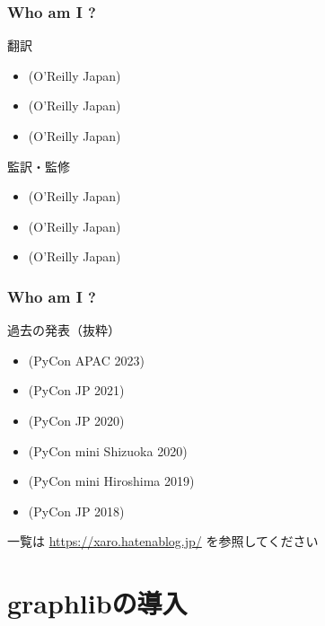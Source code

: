 \documentclass[aspectratio=169,dvipdfmx,12pt,notheorems]{beamer}
\theoremstyle{definition}
\begin{document}
\begin{frame}\frametitle{Who am I ?}

\begin{block}{翻訳}
\begin{itemize}
\item {}(O'Reilly Japan) 
\item {}(O'Reilly Japan)
\item {}(O'Reilly Japan)
\end{itemize}
\end{block}

\begin{block}{監訳・監修}
\begin{itemize}
\item {}(O'Reilly Japan) 
\item {}(O'Reilly Japan)
\item {}(O'Reilly Japan)
\end{itemize}
\end{block}

\end{frame}

\begin{frame}\frametitle{Who am I ?}

\begin{block}{過去の発表（抜粋）}
\begin{itemize}
\item {}(PyCon APAC 2023)
\item {}(PyCon JP 2021)
\item {}(PyCon JP 2020)
\item {}(PyCon mini Shizuoka 2020)
\item {}(PyCon mini Hiroshima 2019)
\item {}(PyCon JP 2018)
\end{itemize}
\end{block}
一覧は \url{https://xaro.hatenablog.jp/} を参照してください
\end{frame}

\section{graphlibの導入}
\end{document}
